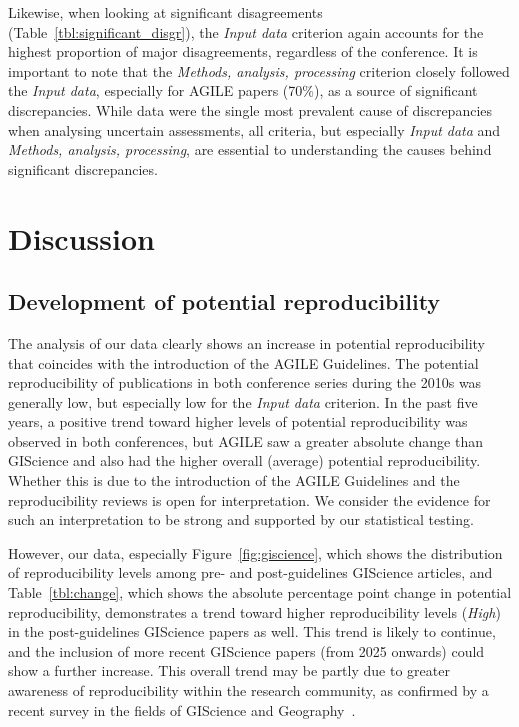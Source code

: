 \documentclass{josis}
\begin{document}
Likewise, when looking at significant disagreements (Table~\ref{tbl:significant_disgr}), the \textit{Input data} criterion again accounts for the highest proportion of major disagreements, regardless of the conference. It is important to note that the \textit{Methods, analysis, processing} criterion closely followed the \textit{Input data}, especially for AGILE papers (70\%), as a source of significant discrepancies. While data were the single most prevalent cause of discrepancies when analysing uncertain assessments, all criteria, but especially \textit{Input data} and \textit{Methods, analysis, processing}, are essential to understanding the causes behind significant discrepancies.




\section{Discussion}

\subsection{Development of potential reproducibility}

The analysis of our data clearly shows an increase in potential reproducibility that coincides with the introduction of the AGILE Guidelines. The potential reproducibility of publications in both conference series during the 2010s was generally low, but especially low for the \textit{Input data} criterion. In the past five years, a positive trend toward higher levels of potential reproducibility was observed in both conferences, but AGILE saw a greater absolute change than GIScience and also had the higher overall (average) potential reproducibility. Whether this is due to the introduction of the AGILE Guidelines and the reproducibility reviews is open for interpretation.
We consider the evidence for such an interpretation to be strong and supported by our statistical testing. 

However, our data, especially Figure~\ref{fig:giscience}, which shows the distribution of reproducibility levels among pre- and post-guidelines GIScience articles, and Table~\ref{tbl:change}, which shows the absolute percentage point change in potential reproducibility, demonstrates a trend toward higher reproducibility levels (\textit{High}) in the post-guidelines GIScience papers as well. This trend is likely to continue, and the inclusion of more recent GIScience papers (from 2025 onwards) could show a further increase. This overall trend may be partly due to greater awareness of reproducibility within the research community, as confirmed by a recent survey in the fields of GIScience and Geography~\cite{kedron2025}. 
\end{document}
